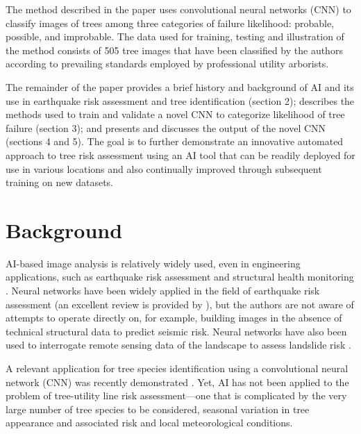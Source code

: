 \documentclass[Journal,letterpaper, SingleSpace, InsideFigs]{ascelike-new}
\begin{document}
The method described in the paper uses convolutional neural networks (CNN) to classify images of trees among three categories of failure likelihood: probable, possible, and improbable.  The data used for training, testing and illustration of the method consists of 505 tree images that have been classified by the authors according to prevailing standards employed by professional utility arborists. 

The remainder of the paper provides a brief history and background of AI and its use in earthquake risk assessment and tree identification (section 2); describes the methods used to train and validate a novel CNN to categorize likelihood of tree failure (section 3); and presents and discusses the output of the novel CNN (sections 4 and 5). The goal is to further demonstrate an innovative automated approach to tree risk assessment using an AI tool that can be readily deployed for use in various locations and also continually improved through subsequent training on new datasets.



\section{Background}

AI-based image analysis is relatively widely used, even in engineering applications, such as earthquake risk assessment \cite{jiao2020artificial,salehi2018emerging} and structural health monitoring \cite{spencer2019advances, wang2019novel}. Neural networks have been widely applied in the field of earthquake risk assessment (an excellent review is provided by ), but the authors are not aware of attempts to operate directly on, for example, building images in the absence of technical structural data to predict seismic risk.  Neural networks have also been used to interrogate remote sensing data of the landscape to assess landslide risk \cite{su2020deep}.


A relevant application for tree species identification using a convolutional neural network (CNN) was recently demonstrated \cite{fricker2019convolutional}. Yet, AI has not been applied to the problem of tree-utility line risk assessment---one that is complicated by the very large number of tree species to be considered, seasonal variation in tree appearance and associated risk and local meteorological conditions. 
\end{document}
